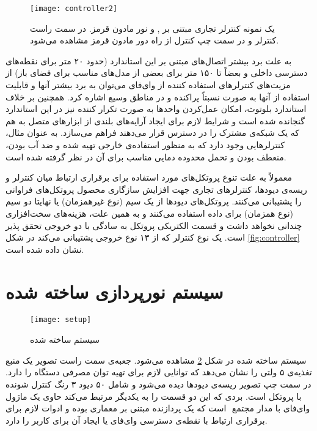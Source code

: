 \documentclass[12pt,twocolumn,a4paper,oneside]{article}
\begin{document}
\begin{figure}[ht]
\centering
\texttt{[image: controller2]}
\caption{یک نمونه کنترلر تجاری مبتنی بر ,  و نور مادون قرمز\cite{amzn:B09BMBHDWN}. در سمت راست کنترلر و در سمت چپ کنترل از راه دور مادون قرمز مشاهده می‌شود.}
\label{fig:controller2}
\end{figure}

به علت برد بیشتر اتصال‌های مبتنی بر این استاندارد (حدود ۲۰ متر برای نقطه‌های دسترسی داخلی و بعضاً تا ۱۵۰ متر برای بعضی از مدل‌های مناسب برای فضای باز\cite{wi-fi}) از مزیت‌های کنترلرهای استفاده کننده از وای‌فای می‌توان به برد بیشتر آنها و قابلیت استفاده از آنها به صورت نسبتاً پراکنده و در مناطق وسیع اشاره کرد. همچنین بر خلاف استاندارد بلوتوث، امکان عمل‌کردن واحدها به صورت تکرار کننده‌ نیز در این استاندارد گنجانده شده است و شرایط لازم برای ایجاد آرایه‌های بلندی از ابزارهای متصل به هم که یک شبکه‌ی مشترک را در دسترس قرار می‌دهند فراهم می‌سازد. به عنوان مثال، کنترلرهایی وجود دارد که به منظور استفاده‌ی خارجی تهیه شده و ضد آب بودن، منعطف بودن و تحمل محدوده دمایی مناسب برای آن در نظر گرفته شده است\cite{patent:CN210485639U}\cite{patent:CN212156755U}\cite{patent:CN209213534U}.

معمولاً به علت تنوع پروتکل‌های مورد استفاده برای برقراری ارتباط میان کنترلر و ریسه‌ی دیودها، کنترلرهای تجاری جهت افزایش سازگاری محصول پروتکل‌های فراوانی را پشتیبانی می‌کنند. پروتکل‌های دیودها از یک سیم (نوع غیرهمزمان) یا نهایتا دو سیم (نوع همزمان) برای داده استفاده می‌کنند و به همین علت، هزینه‌های سخت‌افزاری چندانی نخواهد داشت و قسمت الکتریکی پروتکل به سادگی با دو خروجی تحقق پذیر است. یک نوع کنترلر که از ۱۳ نوع خروجی پشتیبانی می‌کند در شکل \ref{fig:controller} نشان داده شده است\cite{amzn:B07DDB6JHJ}.

\section{سیستم نورپردازی ساخته شده}

\begin{figure}[ht]
\centering
\texttt{[image: setup]}
\caption{سیستم ساخته شده}
\label{fig:setup}
\end{figure}

سیستم ساخته شده‌ در شکل \ref{fig:setup} مشاهده می‌شود. جعبه‌ی سمت راست تصویر یک منبع تغذیه‌ی ۵ ولتی را نشان می‌دهد که توانایی لازم برای تهیه توان مصرفی دستگاه را دارد. در سمت چپ تصویر ریسه‌ی دیودها دیده می‌شود و شامل ۵۰ دیود ۳ رنگ کنترل شونده با پروتکل  است. بردی که این دو قسمت را به یکدیگر مرتبط می‌کند حاوی یک ماژول وای‌فای با مدار مجتمع ‌ است که یک پردازنده مبتنی بر معماری  بوده و ادوات لازم برای برقراری ارتباط با نقطه‌ی دسترسی وای‌فای یا ایجاد آن برای کاربر را دارد\cite{esp8266}.
\end{document}
